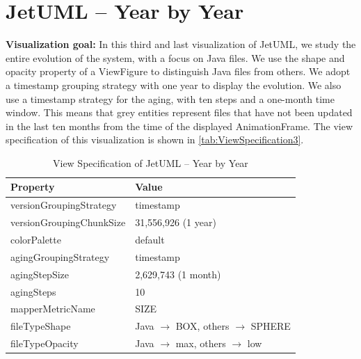 \section{JetUML – Year by Year}
\noindent
\textbf{Visualization goal:}
In this third and last visualization of JetUML, we study the entire evolution of the system, with a focus on Java files. 
We use the shape and opacity property of a ViewFigure to distinguish Java files from others.
We adopt a timestamp grouping strategy with one year to display the evolution. We also use a timestamp strategy for the aging, with ten steps and a one-month time window. This means that grey entities represent files that have not been updated in the last ten months from the time of the displayed AnimationFrame. 
The view specification of this visualization is shown in \autoref{tab:ViewSpecification3}.
\begin{table}[h]
	\small
    \centering
    \begin{tabular}{@{}ll@{}} 
        \toprule
        \textbf{Property} & \textbf{Value} \\\midrule
        versionGroupingStrategy & timestamp\\ 
		versionGroupingChunkSize & 31,556,926 (1 year)\\
		colorPalette & default\\
		agingGroupingStrategy & timestamp \\
		agingStepSize & 2,629,743 (1 month) \\
		agingSteps & 10 \\
		mapperMetricName & SIZE \\
		fileTypeShape & Java $\rightarrow$ BOX, others $\rightarrow$ SPHERE \\
		fileTypeOpacity & Java $\rightarrow$ max, others $\rightarrow$ low \\\bottomrule
    \end{tabular}
    \caption{View Specification of JetUML – Year by Year}
    \label{tab:ViewSpecification3}
\end{table}

